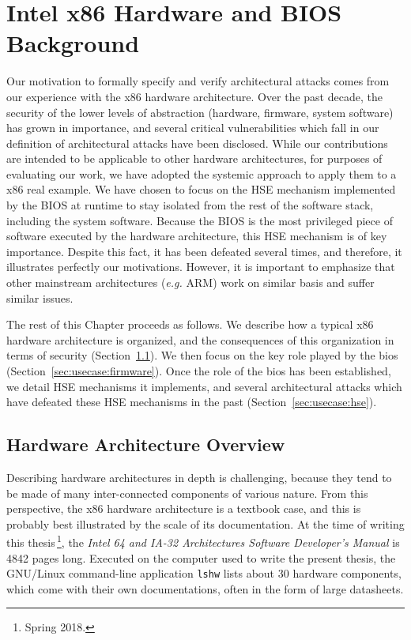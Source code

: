 \chapter{Intel x86 Hardware and BIOS Background}
\label{chapter:usecase}

Our motivation to formally specify and verify architectural attacks comes from
our experience with the x86 hardware architecture.
%
Over the past decade, the security of the lower levels of abstraction (hardware,
firmware, system software) has grown in importance, and several critical
vulnerabilities which fall in our definition of architectural attacks have been
disclosed.
%
While our contributions are intended to be applicable to other hardware
architectures, for purposes of evaluating our work, we have adopted the systemic
approach to apply them to a x86 real example.
%
We have chosen to focus on the HSE mechanism implemented by the BIOS at runtime
to stay isolated from the rest of the software stack, including the system
software.
%
Because the BIOS is the most privileged piece of software executed by the
hardware architecture, this HSE mechanism is of key importance.
%
Despite this fact, it has been defeated several times, and therefore, it
illustrates perfectly our motivations.
%
However, it is important to emphasize that other mainstream architectures
(\emph{e.g.}  ARM) work on similar basis and suffer similar issues.

The rest of this Chapter proceeds as follows.
%
We describe how a typical x86 hardware architecture is organized, and the
consequences of this organization in terms of security
(Section~\ref{sec:usecase:architecture}).
%
We then focus on the key role played by the \ac{bios}
(Section~\ref{sec:usecase:firmware}).
%
Once the role of the \ac{bios} has been established, we detail HSE mechanisms it
implements, and several architectural attacks which have defeated these HSE
mechanisms in the past (Section~\ref{sec:usecase:hse}).

\section{Hardware Architecture Overview}
\label{sec:usecase:architecture}

Describing hardware architectures in depth is challenging, because they tend to
be made of many inter-connected components of various nature.
%
From this perspective, the x86 hardware architecture is a textbook case, and
this is probably best illustrated by the scale of its documentation.
%
At the time of writing this thesis\,\footnote{Spring 2018.}, the \emph{Intel 64
  and IA-32 Architectures Software Developer’s Manual} is 4842 pages long.
%
Executed on the computer used to write the present thesis, the GNU/Linux
command-line application \texttt{lshw} lists about 30 hardware components, which
come with their own documentations, often in the form of large datasheets.

